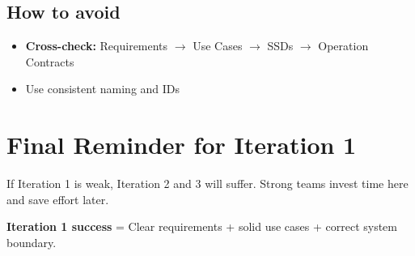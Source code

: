 \documentclass{article}
\begin{document}
\subsection*{How to avoid}
\begin{itemize}[noitemsep]
    \item \textbf{Cross-check:} Requirements $\rightarrow$ Use Cases $\rightarrow$ SSDs $\rightarrow$ Operation Contracts
    \item Use consistent naming and IDs
\end{itemize}

\section*{Final Reminder for Iteration 1}

If Iteration 1 is weak, Iteration 2 and 3 will suffer. Strong teams invest time here and save effort later.

\textbf{Iteration 1 success} = Clear requirements + solid use cases + correct system boundary.
\end{document}
